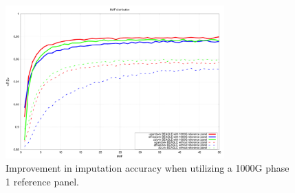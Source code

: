 \begin{figure}
\centering
\includegraphics[width=0.75\textwidth]{fig/imp_accu_improv_1000g}
\caption{Improvement in imputation accuracy when utilizing a 1000G phase 1 reference panel.}
\label{fig:imp_accu_improv_1000G}
\end{figure}